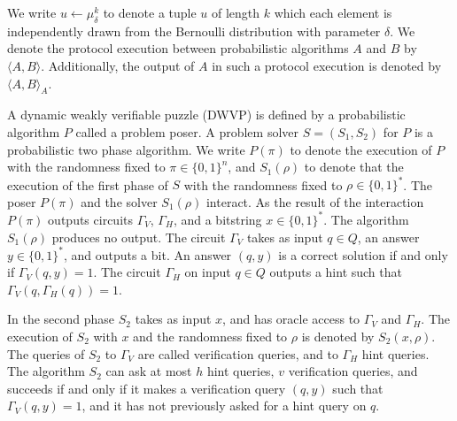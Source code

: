 %
%
\noindent
We write $u \leftarrow \mu_{\delta}^k$ to denote a tuple $u$ of length $k$ which each element
is independently drawn from the Bernoulli distribution with parameter $\delta$.
We denote the protocol execution between probabilistic algorithms $A$ and $B$ by $\langle A, B \rangle$.
Additionally, the output of $A$ in such a protocol execution is denoted by $\langle A, B \rangle_A$.
%
\begin{definition}
  \label{def:dwvp}
  A dynamic weakly verifiable puzzle (DWVP) is defined by a probabilistic algorithm $P$
  called a problem poser.
  A problem solver $S = (S_1, S_2)$ for $P$ is a probabilistic two phase algorithm.
  We write $P(\pi)$ to denote the execution of $P$ with the randomness fixed to $\pi \in \{0,1\}^n$, and $S_1(\rho)$
  to denote that the execution of the first phase of $S$ with the randomness fixed to $\rho \in \{0,1\}^{*}$.
  The poser $P(\pi)$ and the solver $S_1(\rho)$ interact.
  As the result of the interaction $P(\pi)$ outputs circuits $\Gamma_{V}$, $\Gamma_{H}$, and a bitstring $x \in \{0,1\}^{*}$.
  The algorithm $S_1(\rho)$ produces no output.
  The circuit $\Gamma_{V}$ takes as input $q \in Q$, an answer $y \in \{0,1\}^*$,
  and outputs a bit. An answer $(q,y)$ is a correct solution if and only if $\Gamma_V(q,y) = 1$.
  The circuit $\Gamma_H$ on input $q \in Q$ outputs a hint such that $\Gamma_V(q,\Gamma_H(q)) = 1$.

  In the second phase $S_2$ takes as input $x$, and has oracle access to $\Gamma_V$ and $\Gamma_H$.
  The execution of $S_2$ with $x$ and the randomness fixed to $\rho$
  is denoted by $S_2(x, \rho)$. The queries of $S_2$ to $\Gamma_V$ are called verification queries, and to $\Gamma_H$ hint queries.
  The algorithm $S_2$ can ask at most $h$ hint queries, $v$ verification queries, and succeeds if and only if
  it makes a verification query $(q,y)$ such that $\Gamma_V(q,y) = 1$, and it has not previously asked for a hint query on $q$.
\end{definition}
%
